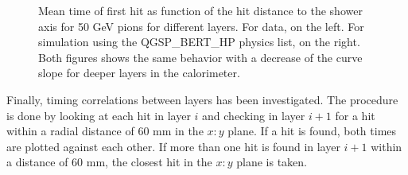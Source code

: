 \documentclass{JINST}
\begin{document}
\begin{figure}[htbp!]
\begin{subfigure}[t]{0.49\textwidth}
    \caption{} \label{fig:Radius_Individual_Sim_50GeV}
  \end{subfigure}
  \caption{Mean time of first hit as function of the hit distance to the shower axis for 50 GeV pions for different layers. For data, on the left. For simulation using the QGSP\_BERT\_HP physics list, on the right. Both figures shows the same behavior with a decrease of the curve slope for deeper layers in the calorimeter.}
  \label{fig:Radius_SimData_50GeVComparison_Individual}
\end{figure}

Finally, timing correlations between layers has been investigated. The procedure is done by looking at each hit in layer $i$ and checking in layer $i+1$ for a hit within a radial distance of 60 mm in the $x:y$ plane. If a hit is found, both times are plotted against each other. If more than one hit is found in layer $i+1$ within a distance of 60 mm, the closest hit in the $x:y$ plane is taken.
\end{document}
